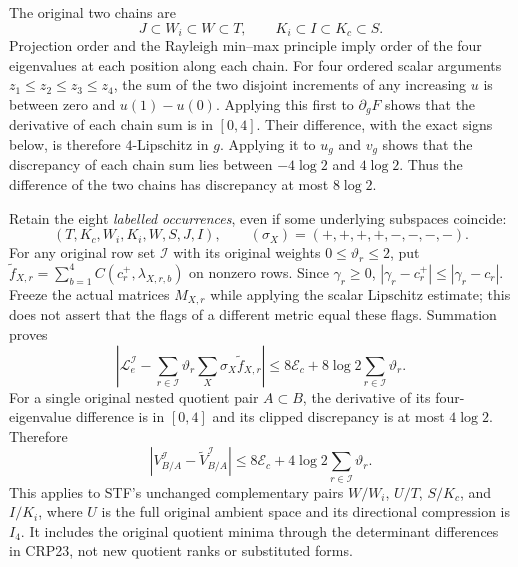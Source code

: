 The original two chains are
\[
J\subset W_i\subset W\subset T,\qquad
K_i\subset I\subset K_c\subset S.\tag{CRP26}
\]
Projection order and the Rayleigh min--max principle imply order of
the four eigenvalues at each position along each chain. For four
ordered scalar arguments $z_1\le z_2\le z_3\le z_4$, the sum of
the two disjoint increments of any increasing $u$ is between zero
and $u(1)-u(0)$. Applying this first to $\partial_gF$ shows that the
derivative of each chain sum is in $[0,4]$. Their difference,
with the exact signs below, is therefore $4$-Lipschitz in $g$.
Applying it to $u_g$ and $v_g$ shows that the discrepancy of each
chain sum lies between $-4\log2$ and $4\log2$. Thus the difference
of the two chains has discrepancy at most $8\log2$.

Retain the eight \emph{labelled occurrences}, even if some underlying
subspaces coincide:
\[
(T,K_c,W_i,K_i,W,S,J,I),\qquad
(\sigma_X)=(+,+,+,+,-,-,-,-).\tag{CRP27}
\]
For any original row set $\mathscr I$ with its original weights
$0\le\vartheta_r\le2$, put
$\widetilde f_{X,r}=\sum_{b=1}^4C(c_r^+,\lambda_{X,r,b})$ on nonzero
rows. Since $\gamma_r\ge0$,
$|\gamma_r-c_r^+|\le|\gamma_r-c_r|$. Freeze the actual matrices
$M_{X,r}$ while applying the scalar Lipschitz estimate; this does
not assert that the flags of a different metric equal these flags.
Summation proves
\[
\boxed{\left|\mathcal L_e^{\mathscr I}-
 \sum_{r\in\mathscr I}\vartheta_r\sum_X\sigma_X\widetilde f_{X,r}\right|
 \le8\mathcal E_c+8\log2\sum_{r\in\mathscr I}\vartheta_r.}
\tag{CRP28}
\]
For a single original nested quotient pair $A\subset B$, the
derivative of its four-eigenvalue difference is in $[0,4]$ and its
clipped discrepancy is at most $4\log2$. Therefore
\[
\boxed{|V_{B/A}^{\mathscr I}-\widetilde V_{B/A}^{\mathscr I}|
 \le8\mathcal E_c+4\log2\sum_{r\in\mathscr I}\vartheta_r.}
\tag{CRP29}
\]
This applies to STF's unchanged complementary pairs $W/W_i$,
$U/T$, $S/K_c$, and $I/K_i$, where $U$ is the full original ambient
space and its directional compression is $I_4$. It includes the
original quotient minima through the determinant differences in
CRP23, not new quotient ranks or substituted forms.

